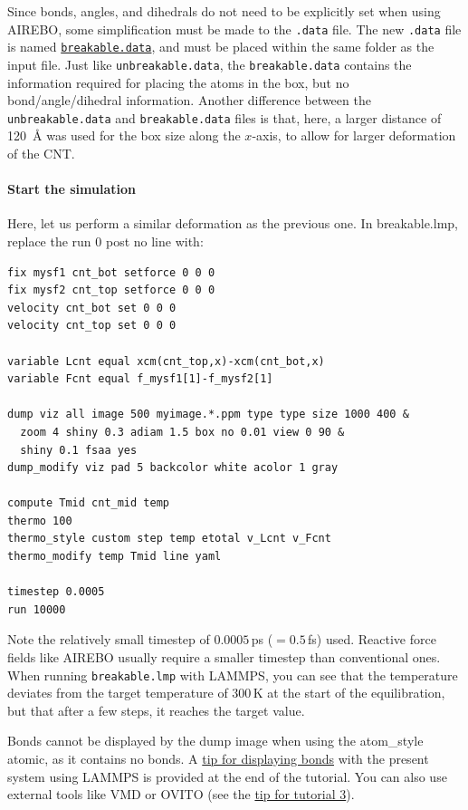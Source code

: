 \documentclass[9pt,tutorial]{livecoms}
\newcommand{\lmpcmd}[1]{\hspace{0pt}\colorbox{listing}{\textcolor{command}{\small{#1}}}\hspace{0pt}} %
\newcommand{\lmpcmdnote}[1]{\hspace{0pt}\colorbox{note_listing}{\textcolor{command}{\small{#1}}}\hspace{0pt}} %
\newcommand{\flecmd}[1]{\textcolor{command}{\texttt{#1}}} %
\newcommand{\dwlcmd}[1]{\textcolor{download}{\texttt{#1}}} %
\newcommand{\filepath}{https://raw.githubusercontent.com/lammpstutorials/lammpstutorials-article/main/files/}
\begin{document}
Since bonds, angles, and dihedrals do not need to be explicitly set when
using AIREBO, some simplification must be made to the \flecmd{.data}
file.  The new \flecmd{.data} file is named
%
\href{\filepath tutorial2/breakable.data}{\dwlcmd{breakable.data}},
%
and must be placed within the same folder as the input file.  Just like
\flecmd{unbreakable.data}, the \flecmd{breakable.data} contains the
information required for placing the atoms in the box, but no
bond/angle/dihedral information.  Another difference between the
\flecmd{unbreakable.data} and \flecmd{breakable.data} files is that,
here, a larger distance of 120~Å was used for the box size along
the $x$-axis, to allow for larger deformation of the CNT.

\paragraph{Start the simulation}

Here, let us perform a similar deformation as the previous one.
In \lmpcmd{breakable.lmp}, replace the \lmpcmd{run 0 post no} line with:
\begin{lstlisting}
fix mysf1 cnt_bot setforce 0 0 0
fix mysf2 cnt_top setforce 0 0 0
velocity cnt_bot set 0 0 0
velocity cnt_top set 0 0 0

variable Lcnt equal xcm(cnt_top,x)-xcm(cnt_bot,x)
variable Fcnt equal f_mysf1[1]-f_mysf2[1]

dump viz all image 500 myimage.*.ppm type type size 1000 400 &
  zoom 4 shiny 0.3 adiam 1.5 box no 0.01 view 0 90 &
  shiny 0.1 fsaa yes
dump_modify viz pad 5 backcolor white acolor 1 gray

compute Tmid cnt_mid temp
thermo 100
thermo_style custom step temp etotal v_Lcnt v_Fcnt
thermo_modify temp Tmid line yaml

timestep 0.0005
run 10000
\end{lstlisting}
Note the relatively small timestep of $0.0005$\,ps ($= 0.5$\,fs) used.  Reactive force
fields like AIREBO usually require a smaller timestep than conventional ones.  When running
\flecmd{breakable.lmp} with LAMMPS, you can see that the temperature deviates
from the target temperature of $300\,\text{K}$ at the start of the equilibration,
but that after a few steps, it reaches the target value.

\begin{note}
  Bonds cannot be displayed by the \lmpcmdnote{dump image} when using
  the \lmpcmdnote{atom\_style atomic}, as it contains no bonds.  A
  \hyperref[tip-dynamic-bonds]{tip for displaying bonds} with the
  present system using LAMMPS is provided at the end of the tutorial.
  You can also use external tools like VMD or OVITO (see the
  \hyperref[tip-external-viz]{tip for tutorial 3}).
\end{note}
\end{document}
